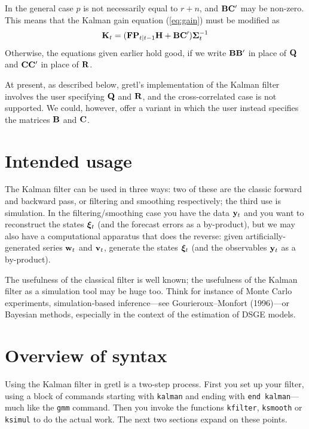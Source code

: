 \documentclass[a4paper]{article}
\newcommand{\obsvec}{\ensuremath\mathbf{y}}
\newcommand{\obsmat}{\ensuremath\mathbf{H}}
\newcommand{\obsdist}{\ensuremath\mathbf{w}}
\newcommand{\obsvar}{\ensuremath\mathbf{R}}
\newcommand{\statevec}{\ensuremath\mathbf{\bm \xi}}
\newcommand{\statemat}{\ensuremath\mathbf{F}}
\newcommand{\strdist}{\ensuremath\mathbf{v}}
\newcommand{\strvar}{\ensuremath\mathbf{Q}}
\newcommand{\statevar}{\ensuremath\mathbf{P}}
\newcommand{\gain}{\ensuremath\mathbf{K}}
\newcommand{\altstrvar}{\ensuremath\mathbf{B}}
\newcommand{\altobsvar}{\ensuremath\mathbf{C}}
\newcommand{\predvar}{\ensuremath{\bm\Sigma}}
\begin{document}
In the general case $p$ is not necessarily equal to $r+n$, and
$\altstrvar \altobsvar'$ may be non-zero.  This means that the
Kalman gain equation (\ref{eq:gain}) must be modified as
%
\[
\gain_t = (\statemat\statevar_{t|t-1}\obsmat + \altstrvar\altobsvar')
  \predvar_t^{-1}
\]
%
Otherwise, the equations given earlier hold good, if we write
$\altstrvar\altstrvar'$ in place of $\strvar$ and
$\altobsvar\altobsvar'$ in place of $\obsvar$.

At present, as described below, gretl's implementation of the Kalman
filter involves the user specifying $\strvar$ and $\obsvar$, and the
cross-correlated case is not supported.  We could, however, offer a
variant in which the user instead specifies the matrices $\altstrvar$
and $\altobsvar$.


\section{Intended usage}

The Kalman filter can be used in three ways: two of these are the
classic forward and backward pass, or filtering and smoothing
respectively; the third use is simulation.  In the
filtering/smoothing case you have the data $\obsvec_t$ and you want to
reconstruct the states $\statevec_t$ (and the forecast errors as a
by-product), but we may also have a computational apparatus that does
the reverse: given artificially-generated series $\obsdist_t$ and
$\strdist_t$, generate the states $\statevec_t$ (and the observables
$\obsvec_t$ as a by-product).

The usefulness of the classical filter is well known; the usefulness
of the Kalman filter as a simulation tool may be huge too. Think for
instance of Monte Carlo experiments, simulation-based inference---see
Gourieroux--Monfort (1996)---or Bayesian methods, especially in the
context of the estimation of DSGE models.

\section{Overview of syntax}

Using the Kalman filter in gretl is a two-step process.  First you set
up your filter, using a block of commands starting with
\texttt{kalman} and ending with \texttt{end kalman}---much like the
\texttt{gmm} command.  Then you invoke the functions \texttt{kfilter},
\texttt{ksmooth} or \texttt{ksimul} to do the actual work.  The next
two sections expand on these points.
\end{document}

